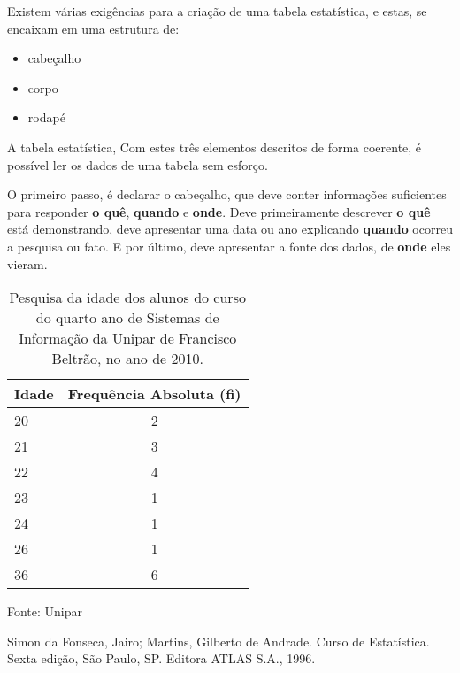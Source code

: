 \documentclass[espaco=simples,appendix=Name]{abnt}
\begin{document}
Existem várias exigências para a criação de uma tabela estatística, e estas, se encaixam em uma estrutura de:



\begin{itemize} 
  \item{cabeçalho}
  \item{corpo}
  \item{rodapé}
\end{itemize} 

A tabela estatística, Com estes três elementos descritos de forma coerente, é possível ler os dados de uma tabela sem esforço. 

O primeiro passo, é declarar o cabeçalho, que deve conter informações suficientes para responder \textbf{o quê}, \textbf{quando} e \textbf{onde}. Deve primeiramente descrever \textbf{o quê} está demonstrando, deve apresentar uma data ou ano explicando \textbf{quando} ocorreu a pesquisa ou fato. E por último, deve apresentar a fonte dos dados, de \textbf{onde} eles vieram.

\begin{table}
\caption{Pesquisa da idade dos alunos do curso do quarto ano de Sistemas de Informação da Unipar de Francisco Beltrão, no ano de 2010.}
\begin{tabular}{|l|c|} 
\hline 
Idade & Frequência Absoluta (\textbf{fi}) \\ \hline 
20 & 2 \\
21 & 3 \\
22 & 4 \\
23 & 1 \\
24 & 1 \\
26 & 1 \\
36 & 6 \\ 
\hline 
\end{tabular}
\small{Fonte: Unipar}
\end{table}


\begin{thebibliography}{9}

Simon da Fonseca, Jairo; Martins, Gilberto de Andrade.
Curso de Estatística.
Sexta edição, São Paulo, SP. Editora ATLAS S.A., 1996.
\end{thebibliography} 
\end{document}
